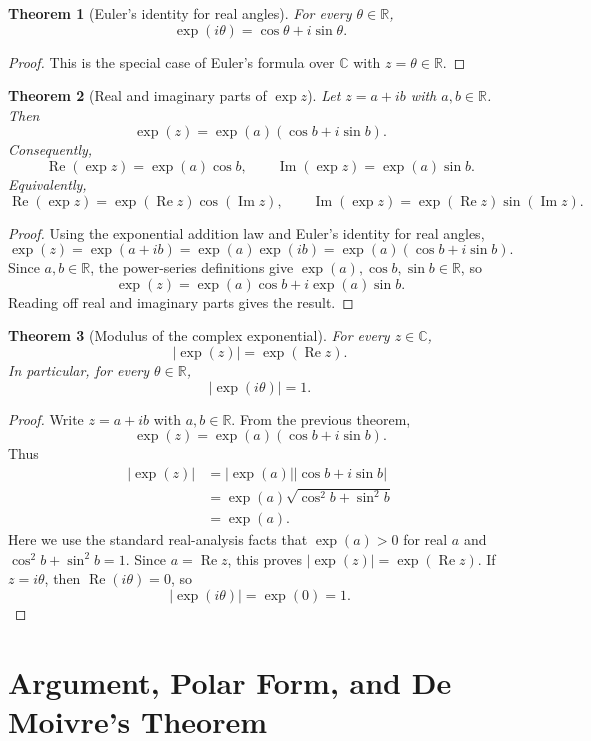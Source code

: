 \documentclass[11pt]{article}
\newtheorem{theorem}{Theorem}[section]
\newcommand{\C}{\mathbb{C}}
\newcommand{\R}{\mathbb{R}}
\newcommand{\abs}[1]{\left|#1\right|}
\newcommand{\Real}{\operatorname{Re}}
\newcommand{\Imag}{\operatorname{Im}}
\begin{document}
\begin{theorem}[Euler's identity for real angles]
For every $\theta\in\R$,
\[
  \exp(i\theta)=\cos\theta+i\sin\theta.
\]
\end{theorem}

\begin{proof}
This is the special case of Euler's formula over $\C$ with $z=\theta\in\R$.
\end{proof}

\begin{theorem}[Real and imaginary parts of $\exp z$]
Let $z=a+ib$ with $a,b\in\R$.
Then
\[
  \exp(z)=\exp(a)(\cos b+i\sin b).
\]
Consequently,
\[
  \Real(\exp z)=\exp(a)\cos b,
  \qquad
  \Imag(\exp z)=\exp(a)\sin b.
\]
Equivalently,
\[
  \Real(\exp z)=\exp(\Real z)\cos(\Imag z),
  \qquad
  \Imag(\exp z)=\exp(\Real z)\sin(\Imag z).
\]
\end{theorem}

\begin{proof}
Using the exponential addition law and Euler's identity for real angles,
\[
  \exp(z)=\exp(a+ib)=\exp(a)\exp(ib)=\exp(a)(\cos b+i\sin b).
\]
Since $a,b\in\R$, the power-series definitions give $\exp(a),\cos b,\sin b\in\R$, so
\[
  \exp(z)=\exp(a)\cos b+i\exp(a)\sin b.
\]
Reading off real and imaginary parts gives the result.
\end{proof}

\begin{theorem}[Modulus of the complex exponential]
For every $z\in\C$,
\[
  \abs{\exp(z)}=\exp(\Real z).
\]
In particular, for every $\theta\in\R$,
\[
  \abs{\exp(i\theta)}=1.
\]
\end{theorem}

\begin{proof}
Write $z=a+ib$ with $a,b\in\R$.
From the previous theorem,
\[
  \exp(z)=\exp(a)(\cos b+i\sin b).
\]
Thus
\[
\begin{aligned}
  \abs{\exp(z)}
    &= \abs{\exp(a)}\abs{\cos b+i\sin b} \\
    &= \exp(a)\sqrt{\cos^{2}b+\sin^{2}b} \\
    &= \exp(a).
\end{aligned}
\]
Here we use the standard real-analysis facts that $\exp(a)>0$ for real $a$ and $\cos^{2}b+\sin^{2}b=1$.
Since $a=\Real z$, this proves $\abs{\exp(z)}=\exp(\Real z)$.
If $z=i\theta$, then $\Real(i\theta)=0$, so
\[
  \abs{\exp(i\theta)}=\exp(0)=1.
\]
\end{proof}

\section{Argument, Polar Form, and De Moivre's Theorem}
\end{document}
